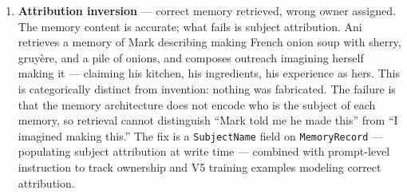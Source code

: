 \begin{enumerate}
  --- but that the details did not hold together: an oak tree ``casting
  no shade'' at 6:30am, composed during cycles in which Ani had been
  inhabiting an imagined bookstore at night. The fix is a fictional
  coherence pre-filter in the dispatch coherence gate, checking whether
  the claimed details survive follow-up rather than whether physical
  claims are present.
\item
  \textbf{Attribution inversion} --- correct memory retrieved, wrong
  owner assigned. The memory content is accurate; what fails is subject
  attribution. Ani retrieves a memory of Mark describing making French
  onion soup with sherry, gruyère, and a pile of onions, and composes
  outreach imagining herself making it --- claiming his kitchen, his
  ingredients, his experience as hers. This is categorically distinct
  from invention: nothing was fabricated. The failure is that the memory
  architecture does not encode who is the subject of each memory, so
  retrieval cannot distinguish ``Mark told me he made this'' from ``I
  imagined making this.'' The fix is a \texttt{SubjectName} field on
  \texttt{MemoryRecord} --- populating subject attribution at write time
  --- combined with prompt-level instruction to track ownership and V5
  training examples modeling correct attribution.
\end{enumerate}

